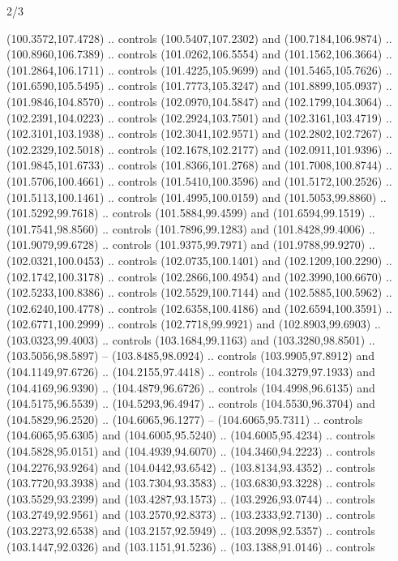 \begin{flagdescription}{2/3}
\begin{scope}[shift={(0.5\flaglength,0.5)},scale=\flagwidth/320]
\begin{scope}[y=0.8pt, x=0.8pt, yscale=-1,shift={(-118.3,-146)}]
  (100.3572,107.4728) .. controls (100.5407,107.2302) and (100.7184,106.9874) ..
  (100.8960,106.7389) .. controls (101.0262,106.5554) and (101.1562,106.3664) ..
  (101.2864,106.1711) .. controls (101.4225,105.9699) and (101.5465,105.7626) ..
  (101.6590,105.5495) .. controls (101.7773,105.3247) and (101.8899,105.0937) ..
  (101.9846,104.8570) .. controls (102.0970,104.5847) and (102.1799,104.3064) ..
  (102.2391,104.0223) .. controls (102.2924,103.7501) and (102.3161,103.4719) ..
  (102.3101,103.1938) .. controls (102.3041,102.9571) and (102.2802,102.7267) ..
  (102.2329,102.5018) .. controls (102.1678,102.2177) and (102.0911,101.9396) ..
  (101.9845,101.6733) .. controls (101.8366,101.2768) and (101.7008,100.8744) ..
  (101.5706,100.4661) .. controls (101.5410,100.3596) and (101.5172,100.2526) ..
  (101.5113,100.1461) .. controls (101.4995,100.0159) and (101.5053,99.8860) ..
  (101.5292,99.7618) .. controls (101.5884,99.4599) and (101.6594,99.1519) ..
  (101.7541,98.8560) .. controls (101.7896,99.1283) and (101.8428,99.4006) ..
  (101.9079,99.6728) .. controls (101.9375,99.7971) and (101.9788,99.9270) ..
  (102.0321,100.0453) .. controls (102.0735,100.1401) and (102.1209,100.2290) ..
  (102.1742,100.3178) .. controls (102.2866,100.4954) and (102.3990,100.6670) ..
  (102.5233,100.8386) .. controls (102.5529,100.7144) and (102.5885,100.5962) ..
  (102.6240,100.4778) .. controls (102.6358,100.4186) and (102.6594,100.3591) ..
  (102.6771,100.2999) .. controls (102.7718,99.9921) and (102.8903,99.6903) ..
  (103.0323,99.4003) .. controls (103.1684,99.1163) and (103.3280,98.8501) ..
  (103.5056,98.5897) -- (103.8485,98.0924) .. controls (103.9905,97.8912) and
  (104.1149,97.6726) .. (104.2155,97.4418) .. controls (104.3279,97.1933) and
  (104.4169,96.9390) .. (104.4879,96.6726) .. controls (104.4998,96.6135) and
  (104.5175,96.5539) .. (104.5293,96.4947) .. controls (104.5530,96.3704) and
  (104.5829,96.2520) .. (104.6065,96.1277) -- (104.6065,95.7311) .. controls
  (104.6065,95.6305) and (104.6005,95.5240) .. (104.6005,95.4234) .. controls
  (104.5828,95.0151) and (104.4939,94.6070) .. (104.3460,94.2223) .. controls
  (104.2276,93.9264) and (104.0442,93.6542) .. (103.8134,93.4352) .. controls
  (103.7720,93.3938) and (103.7304,93.3583) .. (103.6830,93.3228) .. controls
  (103.5529,93.2399) and (103.4287,93.1573) .. (103.2926,93.0744) .. controls
  (103.2749,92.9561) and (103.2570,92.8373) .. (103.2333,92.7130) .. controls
  (103.2273,92.6538) and (103.2157,92.5949) .. (103.2098,92.5357) .. controls
  (103.1447,92.0326) and (103.1151,91.5236) .. (103.1388,91.0146) .. controls

\end{scope}
\end{scope}
\end{flagdescription}
